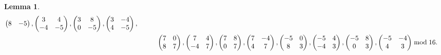 \documentclass[12pt]{article}
\theoremstyle{definition}
\newtheorem{lemma}[theorem]{Lemma}
\numberwithin{equation}{section}
\numberwithin{theorem}{section}
\begin{document}
\begin{lemma}
{\begin{align}
\begin{pmatrix}
8 & -5
\end{pmatrix}, 
\begin{pmatrix}
3 & 4 \\
-4 & -5
\end{pmatrix}, 
\begin{pmatrix}
3 & 8 \\
0 & -5
\end{pmatrix}, 
\begin{pmatrix}
3 & -4 \\
4 & -5
\end{pmatrix},   \notag \\
&\hspace{10mm}
\begin{pmatrix}
7 & 0 \\
8 & 7
\end{pmatrix}, 
\begin{pmatrix}
7 & 4 \\
-4 & 7
\end{pmatrix}, 
\begin{pmatrix}
7 & 8 \\
0 & 7
\end{pmatrix}, 
\begin{pmatrix}
7 & -4 \\
4 & 7
\end{pmatrix},   
\begin{pmatrix}
-5 & 0 \\
8 & 3
\end{pmatrix}, 
\begin{pmatrix}
-5 & 4 \\
-4 & 3
\end{pmatrix}, 
\begin{pmatrix}
-5 & 8 \\
0 & 3
\end{pmatrix}, 
\begin{pmatrix}
-5 & -4 \\
4 & 3
\end{pmatrix}  %
\bmod{16}.  \notag
\end{align}
}
\end{lemma}
\end{document}
